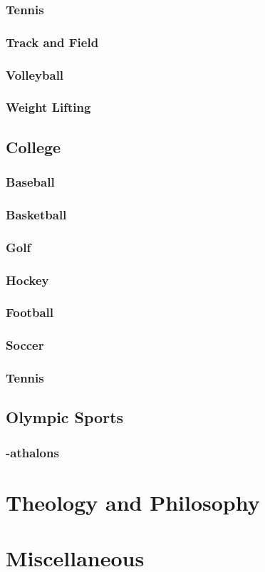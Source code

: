 \documentclass[12pt]{book}
\begin{document}
		\subsection{Tennis}
		\subsection{Track and Field}
		\subsection{Volleyball}
		\subsection{Weight Lifting}
		\newpage
	\section{College}
		\subsection{Baseball}
		\subsection{Basketball}
		\subsection{Golf}
		\subsection{Hockey}
		\subsection{Football}
		\subsection{Soccer}
		\subsection{Tennis}
	\section{Olympic Sports}
		\subsection{-athalons}
		
\chapter{Theology and Philosophy}		
		
\chapter{Miscellaneous}
\end{document}
